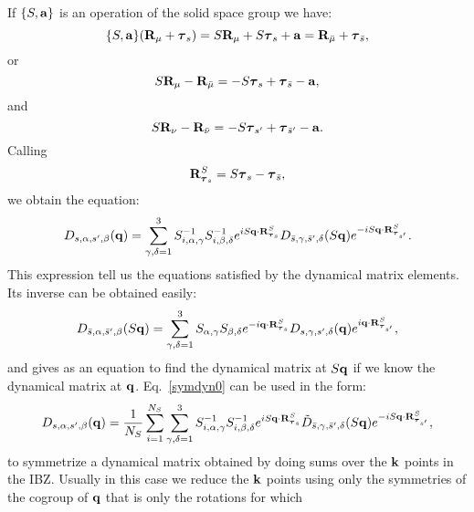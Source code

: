 \documentclass[12pt,a4paper,twoside]{report}
\begin{document}
If $\{S,{\bf a}\}$ is an operation of the solid space group we have:
\begin{equation}
\{S,{\bf a}\} ({\bf R}_\mu + \boldsymbol{\tau}_{s}) = 
S {\bf R}_\mu + S \boldsymbol{\tau}_{s} +{\bf a}=
{\bf R}_{\bar \mu} + \boldsymbol{\tau}_{\bar s},
\end{equation}
or
\begin{equation}
S {\bf R}_\mu -  {\bf R}_{\bar \mu} = - S \boldsymbol{\tau}_s + \boldsymbol{\tau}_{\bar s} - {\bf a},
\end{equation}
and
\begin{equation}
S {\bf R}_\nu -  {\bf R}_{\bar \nu} = - S \boldsymbol{\tau}_{s'} + \boldsymbol{\tau}_{\bar s'} - {\bf a}.
\end{equation}
Calling
\begin{equation}
{\bf R}^{S}_{\boldsymbol{\tau}_s} = S \boldsymbol{\tau}_{s} - \boldsymbol{\tau}_{\bar s},
\label{rstaus}
\end{equation}
we obtain the equation:
\begin{equation}
D_{s,\alpha,s',\beta}({\bf q}) =
\sum_{\gamma,\delta=1}^3  S^{-1}_{i,\alpha,\gamma} S^{-1}_{i,\beta,\delta}
e^{i S {\bf q} \cdot {\bf R}^{S}_{\boldsymbol{\tau}_s} }
D_{\bar s,\gamma,\bar s',\delta}(S{\bf q})
e^{-i S{\bf q} \cdot {\bf R}^{S}_{\boldsymbol{\tau}_{s'}}}.
\label{symdyn0}
\end{equation}
This expression tell us the equations satisfied by the dynamical matrix elements.
Its inverse can be obtained easily:
\begin{equation}
D_{\bar s,\alpha,\bar s',\beta}(S{\bf q}) =
\sum_{\gamma,\delta=1}^3  S_{\alpha,\gamma} S_{\beta,\delta}
e^{-i {\bf q} \cdot {\bf R}^{S}_{\boldsymbol{\tau}_s} }
D_{s,\gamma,s',\delta}({\bf q})
e^{i {\bf q} \cdot {\bf R}^{S}_{\boldsymbol{\tau}_{s'}}},
\label{dynmat_inv}
\end{equation}
and gives as an equation to find the dynamical matrix at $S{\bf q}$ if we know the dynamical matrix at
${\bf q}$.
Eq.~\ref{symdyn0} can be used in the form:
\begin{equation}
D_{s,\alpha,s',\beta}({\bf q}) ={1\over N_S}
\sum_{i=1}^{N_S}
\sum_{\gamma,\delta=1}^3  S^{-1}_{i,\alpha,\gamma} S^{-1}_{i,\beta,\delta}
e^{i S {\bf q} \cdot {\bf R}^{S}_{\boldsymbol{\tau}_s} }
\tilde D_{\bar s,\gamma,\bar s',\delta}(S{\bf q})
e^{-i S{\bf q} \cdot {\bf R}^{S}_{\boldsymbol{\tau}_{s'}}},
\label{symdyn1}
\end{equation}
to symmetrize a dynamical matrix obtained by doing sums over the ${\bf k}$ points in the IBZ. Usually in this case we reduce the ${\bf k}$ points using only the symmetries of the cogroup of ${\bf q}$ that is only the rotations for which
\end{document}
